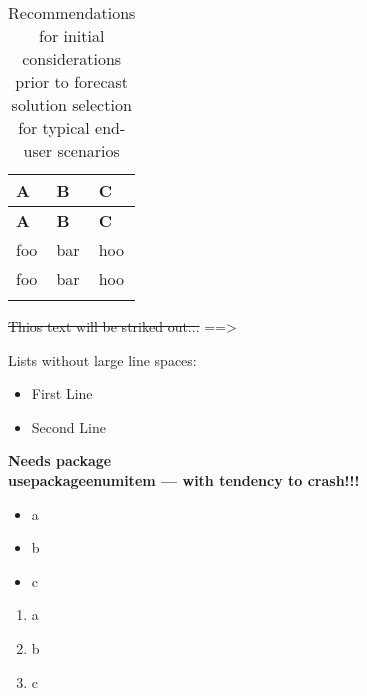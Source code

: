 \begin{longtable}{  p{}  p{}  p{} }
 \caption{ Recommendations for initial considerations prior to forecast solution selection for typical end-user scenarios}\\
 \hline
 \textbf{A} & \textbf{B} & \textbf{C} \\ \hline
 \endfirsthead
 \textbf{A} & \textbf{B} & \textbf{C} \\ \hline
 \endhead
foo & bar & hoo \\ \hline
foo & bar & hoo \\ \hline
  \label{tab:initial_considerations}
\end{longtable}

\sout{Thios text will be striked out...}
==> %


Lists without large line spaces:
\begin{itemize}
        \vspace{-0.2cm}\item First Line
        \vspace{-0.4cm}\item Second Line 
    \end{itemize}


\textbf{Needs package \\usepackage{enumitem} --- with tendency to crash!!!}
\begin{itemize}[noitemsep]
    \item a
    \item b
    \item c
\end{itemize}

\begin{enumerate}[noitemsep]
    \item a
    \item b
    \item c
\end{enumerate}

